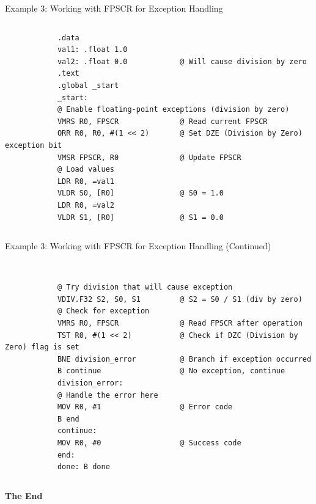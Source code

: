 \documentclass[aspectratio=169]{beamer}
\begin{document}
\begin{frame}[fragile]{Example 3: Working with FPSCR for Exception Handling}
    \begin{columns}
        \begin{verbatim}
            .data
            val1: .float 1.0
            val2: .float 0.0            @ Will cause division by zero
            .text
            .global _start
            _start:
            @ Enable floating-point exceptions (division by zero)
            VMRS R0, FPSCR              @ Read current FPSCR
            ORR R0, R0, #(1 << 2)       @ Set DZE (Division by Zero) exception bit
            VMSR FPSCR, R0              @ Update FPSCR
            @ Load values
            LDR R0, =val1
            VLDR S0, [R0]               @ S0 = 1.0
            LDR R0, =val2
            VLDR S1, [R0]               @ S1 = 0.0
        \end{verbatim}
    \end{columns}
    \end{frame}
    
    \begin{frame}[fragile]{Example 3: Working with FPSCR for Exception Handling (Continued)}
        \begin{columns}
            \begin{verbatim}

            @ Try division that will cause exception
            VDIV.F32 S2, S0, S1         @ S2 = S0 / S1 (div by zero)
            @ Check for exception
            VMRS R0, FPSCR              @ Read FPSCR after operation
            TST R0, #(1 << 2)           @ Check if DZC (Division by Zero) flag is set
            BNE division_error          @ Branch if exception occurred
            B continue                  @ No exception, continue
            division_error:
            @ Handle the error here
            MOV R0, #1                  @ Error code
            B end
            continue:
            MOV R0, #0                  @ Success code
            end:
            done: B done
            \end{verbatim}
    \end{columns}

\end{frame}


\begin{frame}
    \Huge{\centerline{\color{androidGreen}\textbf{The End}}}
\end{frame}
\end{document}

